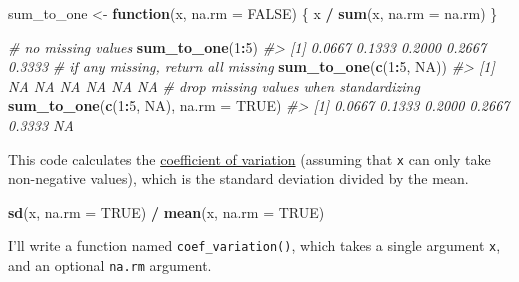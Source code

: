 \documentclass[]{book}
\newenvironment{Shaded}{\begin{snugshade}}{\end{snugshade}}
\newcommand{\CommentTok}[1]{\textcolor[rgb]{0.56,0.35,0.01}{\textit{#1}}}
\newcommand{\ControlFlowTok}[1]{\textcolor[rgb]{0.13,0.29,0.53}{\textbf{#1}}}
\newcommand{\DataTypeTok}[1]{\textcolor[rgb]{0.13,0.29,0.53}{#1}}
\newcommand{\DecValTok}[1]{\textcolor[rgb]{0.00,0.00,0.81}{#1}}
\newcommand{\KeywordTok}[1]{\textcolor[rgb]{0.13,0.29,0.53}{\textbf{#1}}}
\newcommand{\NormalTok}[1]{#1}
\newcommand{\OperatorTok}[1]{\textcolor[rgb]{0.81,0.36,0.00}{\textbf{#1}}}
\newcommand{\OtherTok}[1]{\textcolor[rgb]{0.56,0.35,0.01}{#1}}
\newcommand{\StringTok}[1]{\textcolor[rgb]{0.31,0.60,0.02}{#1}}
\theoremstyle{plain}
\theoremstyle{remark}
\begin{document}
\begin{Shaded}
\begin{Highlighting}[]
\NormalTok{sum_to_one <-}\StringTok{ }\ControlFlowTok{function}\NormalTok{(x, }\DataTypeTok{na.rm =} \OtherTok{FALSE}\NormalTok{) \{}
\NormalTok{  x }\OperatorTok{/}\StringTok{ }\KeywordTok{sum}\NormalTok{(x, }\DataTypeTok{na.rm =}\NormalTok{ na.rm)}
\NormalTok{\}}
\end{Highlighting}
\end{Shaded}

\begin{Shaded}
\begin{Highlighting}[]
\CommentTok{# no missing values}
\KeywordTok{sum_to_one}\NormalTok{(}\DecValTok{1}\OperatorTok{:}\DecValTok{5}\NormalTok{)}
\CommentTok{#> [1] 0.0667 0.1333 0.2000 0.2667 0.3333}
\CommentTok{# if any missing, return all missing}
\KeywordTok{sum_to_one}\NormalTok{(}\KeywordTok{c}\NormalTok{(}\DecValTok{1}\OperatorTok{:}\DecValTok{5}\NormalTok{, }\OtherTok{NA}\NormalTok{))}
\CommentTok{#> [1] NA NA NA NA NA NA}
\CommentTok{# drop missing values when standardizing}
\KeywordTok{sum_to_one}\NormalTok{(}\KeywordTok{c}\NormalTok{(}\DecValTok{1}\OperatorTok{:}\DecValTok{5}\NormalTok{, }\OtherTok{NA}\NormalTok{), }\DataTypeTok{na.rm =} \OtherTok{TRUE}\NormalTok{)}
\CommentTok{#> [1] 0.0667 0.1333 0.2000 0.2667 0.3333     NA}
\end{Highlighting}
\end{Shaded}

This code calculates the
\href{https://en.wikipedia.org/wiki/Coefficient_of_variation}{coefficient
of variation} (assuming that \texttt{x} can only take non-negative
values), which is the standard deviation divided by the mean.

\begin{Shaded}
\begin{Highlighting}[]
\KeywordTok{sd}\NormalTok{(x, }\DataTypeTok{na.rm =} \OtherTok{TRUE}\NormalTok{) }\OperatorTok{/}\StringTok{ }\KeywordTok{mean}\NormalTok{(x, }\DataTypeTok{na.rm =} \OtherTok{TRUE}\NormalTok{)}
\end{Highlighting}
\end{Shaded}

I'll write a function named \texttt{coef\_variation()}, which takes a
single argument \texttt{x}, and an optional \texttt{na.rm} argument.
\end{document}
